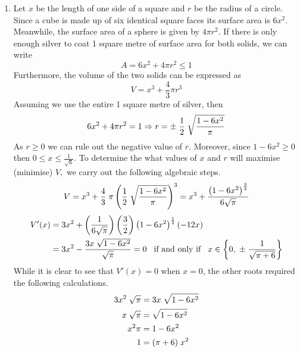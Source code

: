 \documentclass[12pt]{amsart}
\begin{document}
\begin{enumerate}
	\item Let $x$ be the length of one side of a square and $r$ be the radius of a circle. Since a cube is 			made up of six identical square faces its surface area is $6x^2$. Meanwhile, the surface area of a
		sphere is given by $4\pi r^2$. If there is only enough silver to coat 1 square metre of surface area
		for both solids, we can write 
		$$A = 6x^2 + 4\pi r^2 \le 1$$ 
		Furthermore, the volume of the two solids can be expressed as
		$$V = x^3 + \frac{4}{3} \pi r^3$$
		Assuming we use the entire 1 square metre of silver, then
		$$6x^2+4\pi r^2 = 1 \Rightarrow r=\pm \hspace{0.1cm} \frac{1}{2} \hspace{0.1cm}
		\sqrt{\frac{1-6x^2}{\pi}}$$
		As $r \ge 0$ we can rule out the negative value of $r$.  Moreover, since $1-6x^2 \ge 0$ then $0\le x 		\le \frac{1}{\sqrt{6}}$. To determine the what values of $x$ and $r$ will maximise (minimise) $V,$ 			we carry out the following algebraic steps. 
		$$V = x^3+ \frac{4}{3} \hspace{0.1cm} \pi \left(\frac{1}{2} \hspace{0.1cm} 
		\sqrt{\frac{1-6x^2}{\pi}} \right)^3= x^3 + \frac{\left(1-6x^2\right)^{\frac{3}{2}}}{6\sqrt{\pi}}$$
			\begin{align}
				V'(x) & = 3x^2 + \left(\frac{1}{6\sqrt{\pi}} \right) \left(\frac{3}{2}\right) \left(1-6x^2\right)^
				{\frac{1}{2}}\left(-12x\right) \notag \\
				& = 3x^2 - \frac{3x \hspace{0.1cm} \sqrt{1-6x^2}}{\sqrt{\pi}} = 0 \hspace{0.3cm} \text{if and 				only if} \hspace{0.3cm} x \in \left\{0,\hspace{0.1cm} \pm \hspace{0.1cm} 
				\frac{1}{\sqrt{\pi+6}}\right\} \notag
			\end{align}
		While it is clear to see that $V'(x)=0$ when $x=0$, the other roots required the following
		calculations. 
			\begin{align}
				3x^2 \hspace{0.1cm} \sqrt{\pi} & = 3x \hspace{0.1cm} \sqrt{1-6x^2} \notag \\
				x \hspace{0.1cm} \sqrt{\pi} & = \sqrt{1-6x^2} \notag \\
				x^2 \pi & = 1-6x^2 \notag \\
				1 & = (\pi+6) \hspace{0.1cm} x^2 \notag \\

\end{align}
\end{enumerate}
\end{document}
